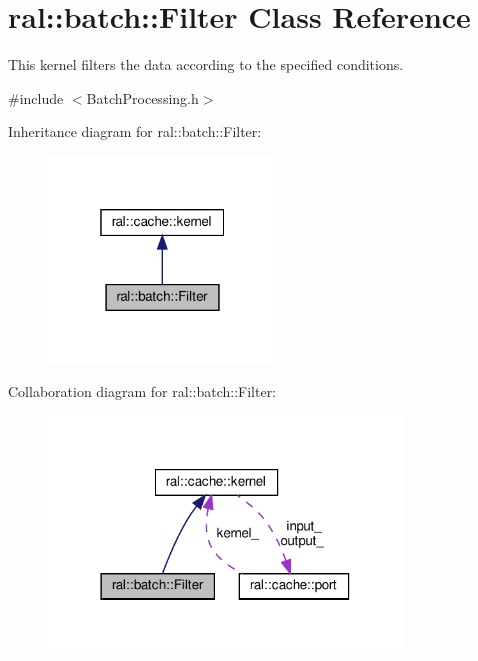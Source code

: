 \hypertarget{classral_1_1batch_1_1Filter}{}\section{ral\+:\+:batch\+:\+:Filter Class Reference}
\label{classral_1_1batch_1_1Filter}


This kernel filters the data according to the specified conditions.  




{\ttfamily \#include $<$Batch\+Processing.\+h$>$}



Inheritance diagram for ral\+:\+:batch\+:\+:Filter\+:\nopagebreak
\begin{figure}[H]
\begin{center}
\leavevmode
\includegraphics[width=172pt]{classral_1_1batch_1_1Filter__inherit__graph}
\end{center}
\end{figure}


Collaboration diagram for ral\+:\+:batch\+:\+:Filter\+:\nopagebreak
\begin{figure}[H]
\begin{center}
\leavevmode
\includegraphics[width=266pt]{classral_1_1batch_1_1Filter__coll__graph}
\end{center}
\end{figure}
